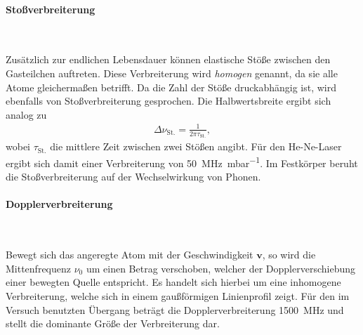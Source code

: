 \documentclass[a4paper,twoside,final]{article}
\begin{document}
\paragraph{Stoßverbreiterung}$~$

Zusätzlich zur endlichen Lebensdauer können elastische Stöße zwischen den Gasteilchen auftreten. Diese Verbreiterung wird \emph{homogen} genannt, da sie alle Atome gleichermaßen betrifft. Da die Zahl der Stöße druckabhängig ist, wird ebenfalls von Stoßverbreiterung gesprochen. Die Halbwertsbreite ergibt sich analog zu
\begin{align}
    \Delta \nu_\text{St.} = \frac{1}{2\pi \tau_\text{St.}},
\end{align}
wobei $\tau_\text{St.}$ die mittlere Zeit zwischen zwei Stößen angibt. Für den He-Ne-Laser ergibt sich damit einer Verbreiterung von \SI{50}{\mega\hertz\per\milli\bar}.
Im Festkörper beruht die Stoßverbreiterung auf der Wechselwirkung von Phonen.

\paragraph{Dopplerverbreiterung}$~$

Bewegt sich das angeregte Atom mit der Geschwindigkeit $\bm{v}$, so wird die Mittenfrequenz $\nu_0$ um einen Betrag verschoben, welcher der Dopplerverschiebung einer bewegten Quelle entspricht. Es handelt sich hierbei um eine inhomogene Verbreiterung, welche sich in einem gaußförmigen Linienprofil zeigt. Für den im Versuch benutzten Übergang beträgt die Dopplerverbreiterung \SI{1500}{\mega\hertz} und stellt die dominante Größe der Verbreiterung dar.
\end{document}
